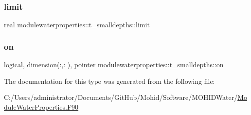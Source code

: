 \subsubsection{\texorpdfstring{limit}{limit}}
{\footnotesize\ttfamily real modulewaterproperties\+::t\+\_\+smalldepths\+::limit\hspace{0.3cm}{\ttfamily [private]}}

\mbox{\label{structmodulewaterproperties_1_1t__smalldepths_abcc492ca3e66dfc49927a1b5add7eb87}} 
\subsubsection{\texorpdfstring{on}{on}}
{\footnotesize\ttfamily logical, dimension(\+:,\+:  ), pointer modulewaterproperties\+::t\+\_\+smalldepths\+::on\hspace{0.3cm}{\ttfamily [private]}}



The documentation for this type was generated from the following file\+:\begin{DoxyCompactItemize}
\item 
C\+:/\+Users/administrator/\+Documents/\+Git\+Hub/\+Mohid/\+Software/\+M\+O\+H\+I\+D\+Water/\mbox{\hyperlink{_module_water_properties_8_f90}{Module\+Water\+Properties.\+F90}}\end{DoxyCompactItemize}
